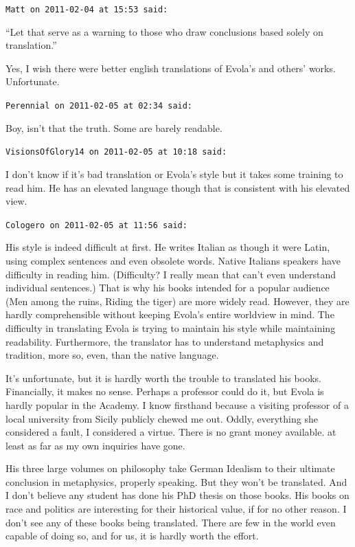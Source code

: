 \begin{footnotesize}
\begin{sffamily}
\texttt{Matt on 2011-02-04 at 15:53 said:}

``Let that serve as a warning to those who draw conclusions based solely on translation.''

Yes, I wish there were better english translations of Evola's and others' works. Unfortunate.

\hfill

\texttt{Perennial on 2011-02-05 at 02:34 said:}

Boy, isn't that the truth. Some are barely readable.

\hfill

\texttt{VisionsOfGlory14 on 2011-02-05 at 10:18 said:}

I don't know if it's bad translation or Evola's style but it takes some training to read him. He has an elevated language though that is consistent with his elevated view.

\hfill

\texttt{Cologero on 2011-02-05 at 11:56 said:}

His style is indeed difficult at first. He writes Italian as though it were Latin, using complex sentences and even obsolete words. Native Italians speakers have difficulty in reading him. (Difficulty? I really mean that can't even understand individual sentences.) That is why his books intended for a popular audience (Men among the ruins, Riding the tiger) are more widely read. However, they are hardly comprehensible without keeping Evola's entire worldview in mind. The difficulty in translating Evola is trying to maintain his style while maintaining readability. Furthermore, the translator has to understand metaphysics and tradition, more so, even, than the native language.

It's unfortunate, but it is hardly worth the trouble to translated his books. Financially, it makes no sense. Perhaps a professor could do it, but Evola is hardly popular in the Academy. I know firsthand because a visiting professor of a local university from Sicily publicly chewed me out. Oddly, everything she considered a fault, I considered a virtue. There is no grant money available. at least as far as my own inquiries have gone.

His three large volumes on philosophy take German Idealism to their ultimate conclusion in metaphysics, properly speaking. But they won't be translated. And I don't believe any student has done his PhD thesis on those books. His books on race and politics are interesting for their historical value, if for no other reason. I don't see any of these books being translated. There are few in the world even capable of doing so, and for us, it is hardly worth the effort.


\end{sffamily}
\end{footnotesize}
